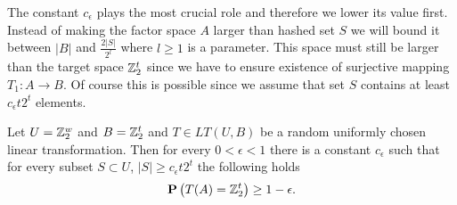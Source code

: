 The constant $c_\epsilon$ plays the most crucial role and therefore we lower its value first. Instead of making the factor space $A$ larger than hashed set $S$ we will bound it between $|B|$ and $\frac{2|S|}{2 ^ l}$ where $l \geq 1$ is a parameter. This space must still be larger than the target space $\mathbb{Z}_{2}^{t}$ since we have to ensure existence of surjective mapping $T_1: A \rightarrow B$. Of course this is possible since we assume that set $S$ contains at least $c_\epsilon t 2^t$ elements.

\begin{remark}
\label{remark-better-c-e}
Let $U = \mathbb{Z}_{2}^{w}$ and $B = \mathbb{Z}_{2}^{t}$ and $T \in LT(U, B)$ be a random uniformly chosen linear transformation. Then for every $0 < \epsilon < 1$ there is a constant $c_\epsilon$ such that for every subset $S \subset U$, $|S| \geq c_\epsilon t 2^t$ the following holds
\[
\mathbf{P}\left(T(A) = \mathbb{Z}_{2}^{t}\right) \geq 1 - \epsilon \text{.}
\]
\end{remark}
